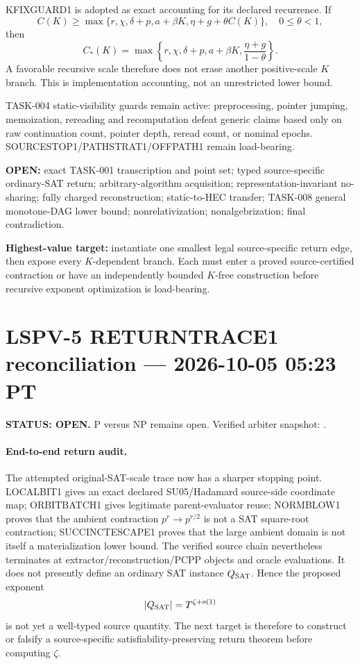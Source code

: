 \documentclass[11pt]{article}
\begin{document}
KFIXGUARD1 is adopted as exact accounting for its declared recurrence. If
\[
C(K)\ge\max\{r,\chi,\delta+p,a+\beta K,\eta+g+\theta C(K)\},\quad 0\le\theta<1,
\]
then
\[
C_*(K)=\max\left\{r,\chi,\delta+p,a+\beta K,\frac{\eta+g}{1-\theta}\right\}.
\]
A favorable recursive scale therefore does not erase another positive-scale \(K\) branch. This is implementation accounting, not an unrestricted lower bound.

TASK-004 static-visibility guards remain active: preprocessing, pointer jumping, memoization, rereading and recomputation defeat generic claims based only on raw continuation count, pointer depth, reread count, or nominal epochs. SOURCESTOP1/PATHSTRAT1/OFFPATH1 remain load-bearing.

\textbf{OPEN:} exact TASK-001 transcription and point set; typed source-specific ordinary-SAT return; arbitrary-algorithm acquisition; representation-invariant no-sharing; fully charged reconstruction; static-to-HEC transfer; TASK-008 general monotone-DAG lower bound; nonrelativization; nonalgebrization; final contradiction.

\textbf{Highest-value target:} instantiate one smallest legal source-specific return edge, then expose every \(K\)-dependent branch. Each must enter a proved source-certified contraction or have an independently bounded \(K\)-free construction before recursive exponent optimization is load-bearing.


\section{LSPV-5 RETURNTRACE1 reconciliation --- 2026-10-05 05:23 PT}
\textbf{STATUS: OPEN.} P versus NP remains open. Verified arbiter snapshot:
.

\paragraph{End-to-end return audit.}
The attempted original-SAT-scale trace now has a sharper stopping point. LOCALBIT1 gives an exact declared SU05/Hadamard source-side coordinate map; ORBITBATCH1 gives legitimate parent-evaluator reuse; NORMBLOW1 proves that the ambient contraction $p^r\to p^{r/2}$ is not a SAT square-root contraction; SUCCINCTESCAPE1 proves that the large ambient domain is not itself a materialization lower bound. The verified source chain nevertheless terminates at extractor/reconstruction/PCPP objects and oracle evaluations. It does not presently define an ordinary SAT instance $Q_{\rm SAT}$. Hence the proposed exponent
\[
|Q_{\rm SAT}|=T^{\zeta+o(1)}
\]
is not yet a well-typed source quantity. The next target is therefore to construct or falsify a source-specific satisfiability-preserving return theorem before computing $\zeta$.
\end{document}
